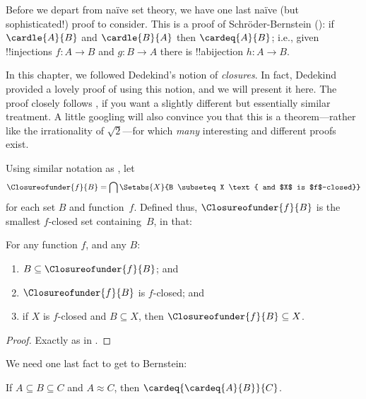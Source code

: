 \documentclass[../../../include/open-logic-section]{subfiles}
\begin{document}


Before we depart from na\"ive set theory, we have one last na\"ive
(but sophisticated!) proof to consider. This is a proof of
Schr\"oder-Bernstein (): if
$\cardle{A}{B}$ and $\cardle{B}{A}$ then $\cardeq{A}{B}$; i.e., given
!!{injection}s $f \colon A \to B$ and $g \colon B \to A$ there is
!!a{bijection} $h \colon A \to B$. 

In this chapter, we followed Dedekind's notion of \emph{closures}. In
fact, Dedekind provided a lovely proof of using this notion, and we
will present it here. The proof closely follows
\citet[pp.~157--8]{Potter2004}, if you want a slightly different but
essentially similar treatment. A little googling will also convince
you that this is a theorem---rather like the irrationality of
$\sqrt{2}$---for which \emph{many} interesting and different proofs
exist.

Using similar notation as ,
let
\[
\Closureofunder{f}{B} = \bigcap \Setabs{X}{B \subseteq X 
\text{ and $X$ is $f$-closed}}
\]
for each set $B$ and function~$f$. Defined thus,
$\Closureofunder{f}{B}$ is the smallest $f$-closed set containing~$B$,
in that:

\begin{prop}
	For any function $f$, and any $B$:
	\begin{enumerate}
		\item{} $B \subseteq \Closureofunder{f}{B}$; and
		\item{} $\Closureofunder{f}{B}$ is $f$-closed; and
		\item{} if $X$ is $f$-closed and $B
		\subseteq X$, then $\Closureofunder{f}{B} \subseteq X$.
	\end{enumerate}
\end{prop}

\begin{proof}
Exactly as in .
\end{proof}

We need one last fact to get to Bernstein:

\begin{prop}
If $A \subseteq B \subseteq C$ and $A \approx C$, then $\cardeq{\cardeq{A}{B}}{C}$.
\end{prop}
\end{document}
